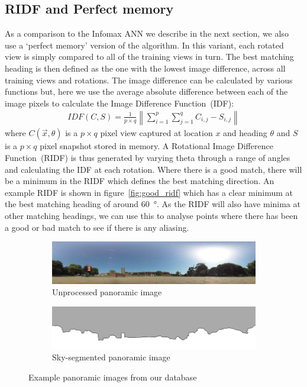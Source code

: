 \documentclass[letterpaper]{article}
\begin{document}
\subsection{RIDF and Perfect memory}
\label{sec:ridf_perfect_memory}
As a comparison to the Infomax ANN we describe in the next section, we also use a `perfect memory' version of the algorithm. 
In this variant, each rotated view is simply compared to all of the training views in turn. 
The best matching heading is then defined as the one with the lowest image difference, across all training views and rotations. 
The image difference can be calculated by various functions but, here we use the average absolute difference between each of the image pixels to calculate the Image Difference Function~(IDF):
%
\begin{align}
    IDF(C, S) = \frac{1}{p \times q} \left\lVert\sum\limits_{i=1}^p{\sum\limits_{j=1}^q{C_{i,j} - S_{i,j}}}\right\rVert
\end{align}
%
where $C(\vec{x}, \theta)$ is a $p \times q$ pixel view captured at location $x$ and heading $\theta$ and $S$ is a $p \times q$ pixel snapshot stored in memory.
A Rotational Image Difference Function~(RIDF) is thus generated by varying theta through a range of angles and calculating the IDF at each rotation. 
Where there is a good match, there will be a minimum in the RIDF which defines the best matching direction. 
An example RIDF is shown in figure~\ref{fig:good_ridf} which has a clear minimum at the best matching heading of around \SI{60}{\degree}.
As the RIDF will also have minima at other matching headings, we can use this to analyse points where there has been a good or bad match to see if there is any aliasing.  

\begin{figure}[t]
    \begin{subfigure}[b]{\columnwidth}
        \includegraphics[width=\columnwidth]{figures/360_240.jpg}
        \caption{Unprocessed panoramic image}
    \end{subfigure}
    \begin{subfigure}[b]{\columnwidth}
        \includegraphics[width=\columnwidth]{figures/360_240_mask.png}
        \caption{Sky-segmented panoramic image}
    \end{subfigure}
    \caption{Example panoramic images from our database}
    \label{fig:database_images}
\end{figure}
\end{document}
